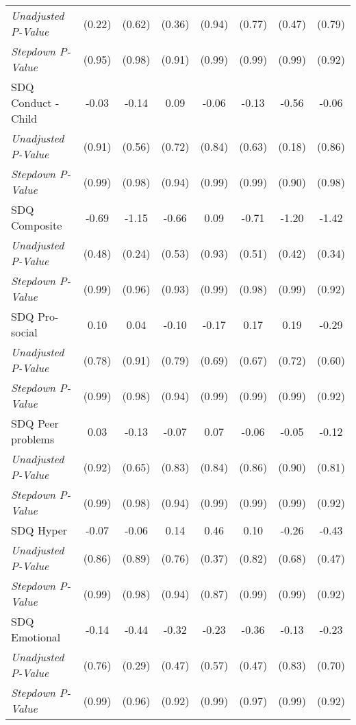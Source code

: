 \begin{tabular}{l c c c c c c c}
\quad \textit{Unadjusted P-Value} & (0.22) & (0.62) & (0.36) & (0.94) & (0.77) & (0.47) & (0.79) \\
\quad \textit{Stepdown P-Value} & (0.95) & (0.98) & (0.91) & (0.99) & (0.99) & (0.99) & (0.92) \\
SDQ Conduct - Child & -0.03 & -0.14 & 0.09 & -0.06 & -0.13 & -0.56 & -0.06 \\
\quad \textit{Unadjusted P-Value} & (0.91) & (0.56) & (0.72) & (0.84) & (0.63) & (0.18) & (0.86) \\
\quad \textit{Stepdown P-Value} & (0.99) & (0.98) & (0.94) & (0.99) & (0.99) & (0.90) & (0.98) \\
SDQ Composite & -0.69 & -1.15 & -0.66 & 0.09 & -0.71 & -1.20 & -1.42 \\
\quad \textit{Unadjusted P-Value} & (0.48) & (0.24) & (0.53) & (0.93) & (0.51) & (0.42) & (0.34) \\
\quad \textit{Stepdown P-Value} & (0.99) & (0.96) & (0.93) & (0.99) & (0.98) & (0.99) & (0.92) \\
SDQ Pro-social & 0.10 & 0.04 & -0.10 & -0.17 & 0.17 & 0.19 & -0.29 \\
\quad \textit{Unadjusted P-Value} & (0.78) & (0.91) & (0.79) & (0.69) & (0.67) & (0.72) & (0.60) \\
\quad \textit{Stepdown P-Value} & (0.99) & (0.98) & (0.94) & (0.99) & (0.99) & (0.99) & (0.92) \\
SDQ Peer problems & 0.03 & -0.13 & -0.07 & 0.07 & -0.06 & -0.05 & -0.12 \\
\quad \textit{Unadjusted P-Value} & (0.92) & (0.65) & (0.83) & (0.84) & (0.86) & (0.90) & (0.81) \\
\quad \textit{Stepdown P-Value} & (0.99) & (0.98) & (0.94) & (0.99) & (0.99) & (0.99) & (0.92) \\
SDQ Hyper & -0.07 & -0.06 & 0.14 & 0.46 & 0.10 & -0.26 & -0.43 \\
\quad \textit{Unadjusted P-Value} & (0.86) & (0.89) & (0.76) & (0.37) & (0.82) & (0.68) & (0.47) \\
\quad \textit{Stepdown P-Value} & (0.99) & (0.98) & (0.94) & (0.87) & (0.99) & (0.99) & (0.92) \\
SDQ Emotional & -0.14 & -0.44 & -0.32 & -0.23 & -0.36 & -0.13 & -0.23 \\
\quad \textit{Unadjusted P-Value} & (0.76) & (0.29) & (0.47) & (0.57) & (0.47) & (0.83) & (0.70) \\
\quad \textit{Stepdown P-Value} & (0.99) & (0.96) & (0.92) & (0.99) & (0.97) & (0.99) & (0.92) \\

\end{tabular}
